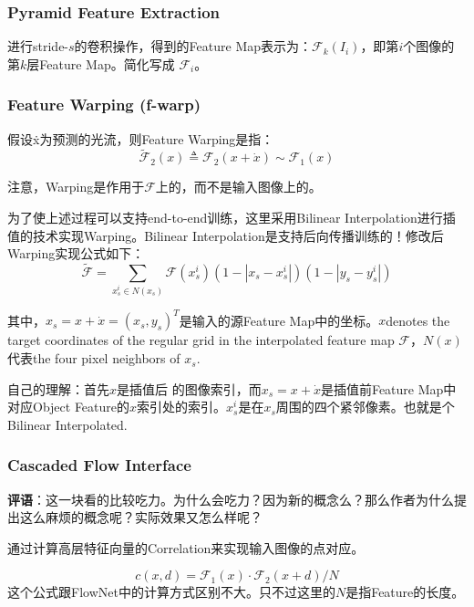 \subsubsection{Pyramid Feature Extraction}

进行stride-$s$的卷积操作，得到的Feature Map表示为：$\mathcal{F}_k(I_i)$，即第$i$个图像的第$k$层Feature Map。简化写成 $\mathcal{F}_i$。

\subsubsection{Feature Warping (f-warp)}

假设\.x为预测的光流，则Feature Warping是指：
\begin{displaymath}
\tilde{\mathcal{F}}_2(x) \triangleq \mathcal{F}_2(x + \dot{x}) \sim \mathcal{F}_1(x) 
\end{displaymath}

注意，Warping是作用于$\mathcal{F}$上的，而不是输入图像上的。

为了使上述过程可以支持end-to-end训练，这里采用Bilinear Interpolation进行插值的技术实现Warping。Bilinear Interpolation是支持后向传播训练的！修改后Warping实现公式如下：
\begin{displaymath}
\tilde{\mathcal{F}} = \sum_{x_s^i \in N(x_s)} \mathcal{F}(x_s^i)(1-|x_s - x_s^i|)(1 - |y_s - y_s^i|)
\end{displaymath}

其中，$x_s = x + \dot{x} = (x_s, y_s)^T$是输入的源Feature Map中的坐标。$x$denotes the target coordinates of the regular grid in the interpolated feature map $\mathcal{F}$，$N(x)$代表the four pixel neighbors of $x_s$.

自己的理解：首先$x$是插值后 的图像索引，而$x_s = x + \dot{x}$是插值前Feature Map中对应Object Feature的$x$索引处的索引。$x_s^i$是在$x_s$周围的四个紧邻像素。也就是个Bilinear Interpolated.

\subsubsection{Cascaded Flow Interface}

{\color{red} \textbf{评语}：这一块看的比较吃力。为什么会吃力？因为新的概念么？那么作者为什么提出这么麻烦的概念呢？实际效果又怎么样呢？}

通过计算高层特征向量的Correlation来实现输入图像的点对应。

\begin{displaymath}
c(x, d) = \mathcal{F}_1(x) \cdot \mathcal{F}_2(x + d) / N
\end{displaymath}
这个公式跟FlowNet中的计算方式区别不大。只不过这里的$N$是指Feature的长度。

